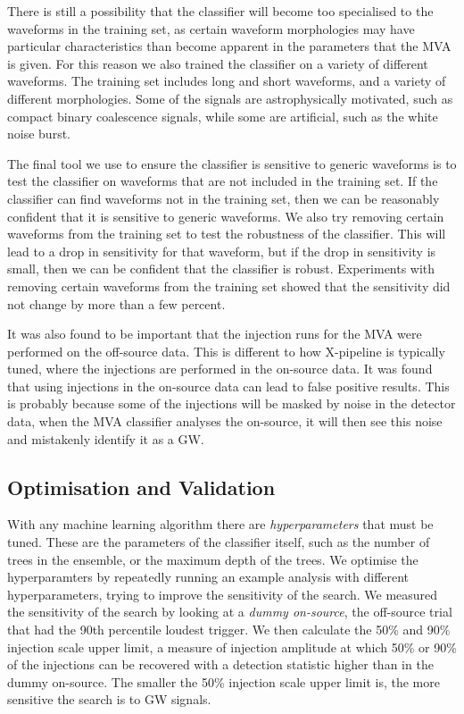 \documentclass[11pt]{cuthesis}
\newcommand{\xp}{X-pipeline }
\begin{document}
There is still a possibility that the classifier will become too specialised to the waveforms in the training set, as certain waveform morphologies may have particular characteristics than become apparent in the parameters that the MVA is given. For this reason we also trained the classifier on a variety of different waveforms. The training set includes long and short waveforms, and a variety of different morphologies. Some of the signals are astrophysically motivated, such as compact binary coalescence signals, while some are artificial, such as the white noise burst. 

The final tool we use to ensure the classifier is sensitive to generic waveforms is to test the classifier on waveforms that are not included in the training set. If the classifier can find waveforms not in the training set, then we can be reasonably confident that it is sensitive to generic waveforms. We also try removing certain waveforms from the training set to test the robustness of the classifier. This will lead to a drop in sensitivity for that waveform, but if the drop in sensitivity is small, then we can be confident that the classifier is robust. Experiments with removing certain waveforms from the training set showed that the sensitivity did not change by more than a few percent.

It was also found to be important that the injection runs for the MVA were performed on the off-source data. This is different to how \xp is typically tuned, where the injections are performed in the on-source data. It was found that using injections in the on-source data can lead to false positive results. This is probably because some of the injections will be masked by noise in the detector data, when the MVA classifier analyses the on-source, it will then see this noise and mistakenly identify it as a GW. 

\subsection{Optimisation and Validation} \label{sec:opt}
With any machine learning algorithm there are \textit{hyperparameters} that must be tuned. These are the parameters of the classifier itself, such as the number of trees in the ensemble, or the maximum depth of the trees. We optimise the hyperparamters by repeatedly running an example analysis with different hyperparameters, trying to improve the sensitivity of the search. We measured the sensitivity of the search by looking at a \textit{dummy on-source}, the off-source trial that had the 90th percentile loudest trigger. We then calculate the 50\% and 90\% injection scale upper limit, a measure of injection amplitude at which 50\% or 90\% of the injections can be recovered with a detection statistic higher than in the dummy on-source. The smaller the 50\% injection scale upper limit is, the more sensitive the search is to GW signals.
\end{document}
